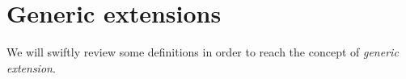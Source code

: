\section{Generic extensions}

We will swiftly review some definitions in order to reach the concept
of \emph{generic extension}. 

